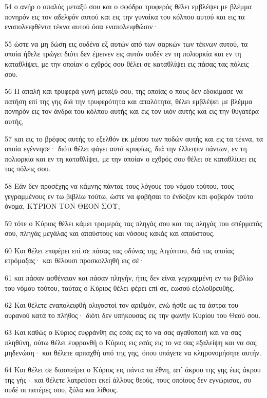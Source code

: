 \par 54 ο ανήρ ο απαλός μεταξύ σου και ο σφόδρα τρυφερός θέλει εμβλέψει με βλέμμα πονηρόν εις τον αδελφόν αυτού και εις την γυναίκα του κόλπου αυτού και εις τα εναπολειφθέντα τέκνα αυτού όσα εναπολειφθώσιν·
\par 55 ώστε να μη δώση εις ουδένα εξ αυτών από των σαρκών των τέκνων αυτού, τα οποία ήθελε τρώγει διότι δεν έμεινεν εις αυτόν ουδέν εν τη πολιορκία και εν τη καταθλίψει, με την οποίαν ο εχθρός σου θέλει σε καταθλίψει εις πάσας τας πόλεις σου.
\par 56 Η απαλή και τρυφερά γυνή μεταξύ σου, της οποίας ο πους δεν εδοκίμασε να πατήση επί της γης διά την τρυφερότητα και απαλότητα, θέλει εμβλέψει με βλέμμα πονηρόν εις τον άνδρα του κόλπου αυτής και εις τον υιόν αυτής και εις την θυγατέρα αυτής,
\par 57 και εις το βρέφος αυτής το εξελθόν εκ μέσου των ποδών αυτής και εις τα τέκνα, τα οποία εγέννησε· διότι θέλει φάγει αυτά κρυφίως, διά την έλλειψιν πάντων, εν τη πολιορκία και εν τη καταθλίψει, με την οποίαν ο εχθρός σου θέλει σε καταθλίψει εις τας πόλεις σου.
\par 58 Εάν δεν προσέχης να κάμνης πάντας τους λόγους του νόμου τούτου, τους γεγραμμένους εν τω βιβλίω τούτω, ώστε να φοβήσαι το ένδοξον και φοβερόν τούτο όνομα, ΚΥΡΙΟΝ ΤΟΝ ΘΕΟΝ ΣΟΥ,
\par 59 τότε ο Κύριος θέλει κάμει τρομεράς τας πληγάς σου και τας πληγάς του σπέρματός σου, πληγάς μεγάλας και απαύστους και νόσους κακάς και απαύστους.
\par 60 Και θέλει επιφέρει επί σε πάσας τας οδύνας της Αιγύπτου, διά τας οποίας ετρόμαξας· και θέλουσι προσκολληθή εις σέ·
\par 61 και πάσαν ασθένειαν και πάσαν πληγήν, ήτις δεν είναι γεγραμμένη εν τω βιβλίω του νόμου τούτου, ταύτας ο Κύριος θέλει φέρει επί σε, εωσού εξολοθρευθής.
\par 62 Και θέλετε εναπολειφθή ολιγοστοί τον αριθμόν, ενώ ήσθε ως τα άστρα του ουρανού κατά το πλήθος· διότι δεν υπήκουσας εις την φωνήν Κυρίου του Θεού σου.
\par 63 Και καθώς ο Κύριος ευφράνθη εις εσάς εις το να σας αγαθοποιή και να σας πληθύνη, ούτω θέλει ευφρανθή ο Κύριος εις εσάς εις το να σας εξαλείψη και να σας μηδενώση· και θέλετε αρπαχθή από της γης, όπου υπάγετε να κληρονομήσητε αυτήν.
\par 64 Και θέλει σε διασπείρει ο Κύριος εις πάντα τα έθνη, απ' άκρου της γης έως άκρου της γής· και θέλετε λατρεύσει εκεί άλλους θεούς, τους οποίους δεν εγνώρισας, συ ουδέ οι πατέρες σου, ξύλα και λίθους.
